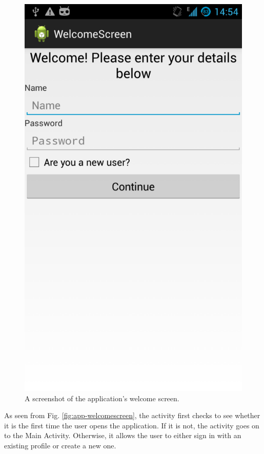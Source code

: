 \begin{figure}
 \centering 
 \includegraphics[clip = true, trim = 0 620 0 60,
 scale=0.2]{welcome_screenshot}
 \caption{A screenshot of the application's welcome screen.}
 \label{fig:welcomescreen-screenshot}
\end{figure}

As seen from Fig. \ref{fig:app-welcomescreen}, the
activity first checks to see whether it is the first time the user opens the
application. If it is not, the activity goes on to the Main Activity. Otherwise, it allows
the user to either sign in with an existing profile or create a new one.

